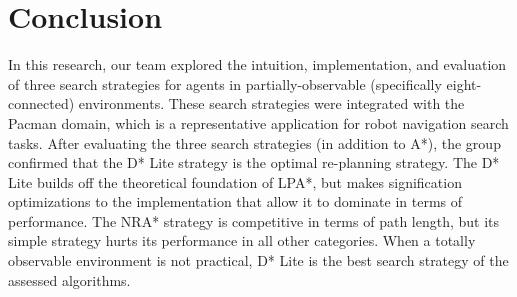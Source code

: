 \section{Conclusion}
In this research, our team explored the intuition, implementation, and evaluation of three search strategies for agents in partially-observable (specifically eight-connected) environments. These search strategies were integrated with the Pacman domain, which is a representative application for robot navigation search tasks.
After evaluating the three search strategies (in addition to A*), the group confirmed that the D* Lite strategy is the optimal re-planning strategy. The D* Lite builds off the theoretical foundation of LPA*, but makes signification optimizations to the implementation that allow it to dominate in terms of performance. The NRA* strategy is competitive in terms of path length, but its simple strategy hurts its performance in all other categories. When a totally observable environment is not practical, D* Lite is the best search strategy of the assessed algorithms.